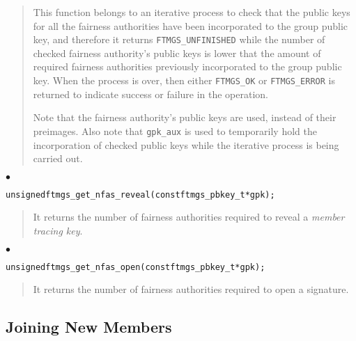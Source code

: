 \documentclass[a4paper]{article}
\newenvironment{api}%
{\noindent$\bullet$\hfill\begin{minipage}[t]{0.97\linewidth}\footnotesize\begin{alltt}}%
{\end{alltt}\end{minipage}}%
\begin{document}
\begin{quote}\footnotesize
This function belongs to an iterative process to check that the public
keys for all the fairness authorities have been incorporated to the
group public key, and therefore it returns \verb|FTMGS_UNFINISHED|
while the number of checked fairness authority's public keys is lower
that the amount of required fairness authorities previously
incorporated to the group public key. When the process is over, then
either \verb|FTMGS_OK| or \verb|FTMGS_ERROR| is returned to indicate
success or failure in the operation.

Note that the fairness authority's public keys are used, instead of
their preimages. Also note that \verb|gpk_aux| is used to temporarily
hold the incorporation of checked public keys while the iterative
process is being carried out.
\end{quote}
\begin{api}
unsigned ftmgs_get_nfas_reveal(const ftmgs_pbkey_t* gpk);
\end{api}
\begin{quote}\footnotesize
It returns the number of fairness authorities required to reveal a
\emph{member tracing key}.
\end{quote}
\begin{api}
unsigned ftmgs_get_nfas_open(const ftmgs_pbkey_t* gpk);
\end{api}
\begin{quote}\footnotesize
It returns the number of fairness authorities required to open a
signature.
\end{quote}

\subsection{Joining New Members}

\end{document}
